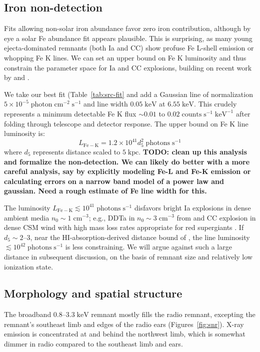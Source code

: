 \documentclass[preprint2,tighten,trackchanges]{aastex6}
\newcommand*{\mt}{\mathrm}
\newcommand*{\unit}[1]{\;\mt{#1}}  %
\newcommand*{\abt}{\mathord{\sim}} %
\begin{document}
\subsection{Iron non-detection}

Fits allowing non-solar iron abundance favor zero iron contribution, although
by eye a solar Fe abundance fit appears plausible.
This is surprising, as many young ejecta-dominated remnants (both Ia and CC)
show profuse Fe L-shell emission or whopping Fe K lines.
We can set an upper bound on Fe K luminosity and thus constrain the parameter
space for Ia and CC explosions, building on recent work by
\citet{yamaguchi2014-iron} and \citet{patnaude2015}.

We take our best fit (Table~\ref{tab:src-fit} and add a Gaussian line of
normalization $5 \times 10^{-5} \unit{photon\;cm^{-2}\;s^{-1}}$ and
line width $0.05 \unit{keV}$ at $6.55 \unit{keV}$.
This crudely represents a minimum detectable Fe K flux
$\abt 0.01$ to $0.02 \unit{counts\;s^{-1}\;keV^{-1}}$ after folding through
telescope and detector response.
The upper bound on Fe K line luminosity is:
\[
    L_{\mt{Fe-K}} = 1.2 \times 10^{41} d_5^2 \unit{photons\;s^{-1}}
\]
where $d_5$ represents distance scaled to $5 \unit{kpc}$.
\textbf{TODO: clean up this analysis and formalize the non-detection.
We can likely do better with a more careful analysis, say by explicitly
modeling Fe-L and Fe-K emission or calculating errors on a narrow band model of
a power law and gaussian.  Need a rough estimate of Fe line width for this.}

The luminosity $L_{\mt{Fe-K}} \lesssim 10^{41} \unit{photons\;s^{-1}}$
disfavors bright Ia explosions in dense ambient media
$n_0 \sim 1 \unit{cm^{-3}}$; e.g., DDTa in $n_0 \sim 3 \unit{cm^{-3}}$ from
\citet{badenes2003, badenes2005, badenes2006} \citep{yamaguchi2014-iron}
and CC explosion in dense CSM wind with high mass loss rates appropriate for
red supergiants \citep{patnaude2015}.
If $d_5 \sim 2$--$3$, near the HI-absorption-derived distance bound of
\citet{gaensler1998-g309}, the line luminosity
$\lesssim 10^{42} \unit{photons\;s^{-1}}$ is less constraining.
We will argue against such a large distance in subsequent discussion, on
the basis of remnant size and relatively low ionization state.

\subsection{Morphology and spatial structure}

The broadband $0.8$--$3.3 \unit{keV}$ remnant mostly fills the radio remnant,
excepting the remnant's southeast limb and edges of the radio ears
(Figures~\ref{fig:snr}).
X-ray emission is concentrated at and behind the northwest limb, which is
somewhat dimmer in radio compared to the southeast limb and ears.
\end{document}
